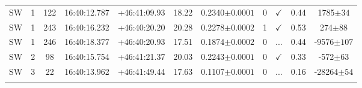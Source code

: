 \begin{landscape}
\begin{longtable}{ccccccccccc}
	SW & 1 & 122 & 16:40:12.787 & +46:41:09.93 & 18.22 & 0.2340$\pm{0.0001}$ & 0 & $\checkmark$ & 0.44 & 1785$\pm{34}$ \\
	SW & 1 & 243 & 16:40:16.232 & +46:40:20.20 & 20.28 & 0.2278$\pm{0.0002}$ & 1 & $\checkmark$ & 0.53 & 274$\pm{88}$ \\
	SW & 1 & 246 & 16:40:18.377 & +46:40:20.93 & 17.51 & 0.1874$\pm{0.0002}$ & 0 & ... & 0.44 & -9576$\pm{107}$ \\
	SW & 2 & 98 & 16:40:15.754 & +46:41:21.37 & 20.03 & 0.2243$\pm{0.0001}$ & 0 & $\checkmark$ & 0.33 & -572$\pm{63}$ \\
	SW & 3 & 22 & 16:40:13.962 & +46:41:49.44 & 17.63 & 0.1107$\pm{0.0001}$ & 0 & ... & 0.16 & -28264$\pm{54}$ \\
	\hline
	\label{2tbl:VCSJ164019.8+464241.5}
	\end{longtable}
\end{landscape}


